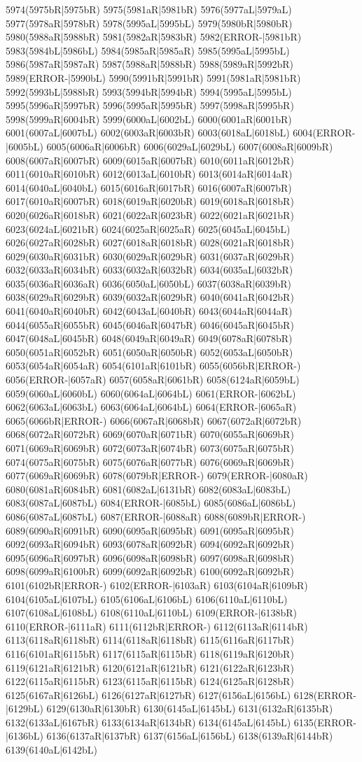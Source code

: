 5974(5975bR|5975bR) 5975(5981aR|5981bR) 5976(5977aL|5979aL) 5977(5978aR|5978bR) 5978(5995aL|5995bL) 5979(5980bR|5980bR) 5980(5988aR|5988bR) 5981(5982aR|5983bR) 5982(ERROR-|5981bR) 5983(5984bL|5986bL) 5984(5985aR|5985aR) 5985(5995aL|5995bL) 5986(5987aR|5987aR) 5987(5988aR|5988bR) 5988(5989aR|5992bR) 5989(ERROR-|5990bL) 5990(5991bR|5991bR) 5991(5981aR|5981bR) 5992(5993bL|5988bR) 5993(5994bR|5994bR) 5994(5995aL|5995bL) 5995(5996aR|5997bR) 5996(5995aR|5995bR) 5997(5998aR|5995bR) 5998(5999aR|6004bR) 5999(6000aL|6002bL) 6000(6001aR|6001bR) 6001(6007aL|6007bL) 6002(6003aR|6003bR) 6003(6018aL|6018bL) 6004(ERROR-|6005bL) 6005(6006aR|6006bR) 6006(6029aL|6029bL) 6007(6008aR|6009bR) 6008(6007aR|6007bR) 6009(6015aR|6007bR) 6010(6011aR|6012bR) 6011(6010aR|6010bR) 6012(6013aL|6010bR) 6013(6014aR|6014aR) 6014(6040aL|6040bL) 6015(6016aR|6017bR) 6016(6007aR|6007bR) 6017(6010aR|6007bR) 6018(6019aR|6020bR) 6019(6018aR|6018bR) 6020(6026aR|6018bR) 6021(6022aR|6023bR) 6022(6021aR|6021bR) 6023(6024aL|6021bR) 6024(6025aR|6025aR) 6025(6045aL|6045bL) 6026(6027aR|6028bR) 6027(6018aR|6018bR) 6028(6021aR|6018bR) 6029(6030aR|6031bR) 6030(6029aR|6029bR) 6031(6037aR|6029bR) 6032(6033aR|6034bR) 6033(6032aR|6032bR) 6034(6035aL|6032bR) 6035(6036aR|6036aR) 6036(6050aL|6050bL) 6037(6038aR|6039bR) 6038(6029aR|6029bR) 6039(6032aR|6029bR) 6040(6041aR|6042bR) 6041(6040aR|6040bR) 6042(6043aL|6040bR) 6043(6044aR|6044aR) 6044(6055aR|6055bR) 6045(6046aR|6047bR) 6046(6045aR|6045bR) 6047(6048aL|6045bR) 6048(6049aR|6049aR) 6049(6078aR|6078bR) 6050(6051aR|6052bR) 6051(6050aR|6050bR) 6052(6053aL|6050bR) 6053(6054aR|6054aR) 6054(6101aR|6101bR) 6055(6056bR|ERROR-) 6056(ERROR-|6057aR) 6057(6058aR|6061bR) 6058(6124aR|6059bL) 6059(6060aL|6060bL) 6060(6064aL|6064bL) 6061(ERROR-|6062bL) 6062(6063aL|6063bL) 6063(6064aL|6064bL) 6064(ERROR-|6065aR) 6065(6066bR|ERROR-) 6066(6067aR|6068bR) 6067(6072aR|6072bR) 6068(6072aR|6072bR) 6069(6070aR|6071bR) 6070(6055aR|6069bR) 6071(6069aR|6069bR) 6072(6073aR|6074bR) 6073(6075aR|6075bR) 6074(6075aR|6075bR) 6075(6076aR|6077bR) 6076(6069aR|6069bR) 6077(6069aR|6069bR) 6078(6079bR|ERROR-) 6079(ERROR-|6080aR) 6080(6081aR|6084bR) 6081(6082aL|6131bR) 6082(6083aL|6083bL) 6083(6087aL|6087bL) 6084(ERROR-|6085bL) 6085(6086aL|6086bL) 6086(6087aL|6087bL) 6087(ERROR-|6088aR) 6088(6089bR|ERROR-) 6089(6090aR|6091bR) 6090(6095aR|6095bR) 6091(6095aR|6095bR) 6092(6093aR|6094bR) 6093(6078aR|6092bR) 6094(6092aR|6092bR) 6095(6096aR|6097bR) 6096(6098aR|6098bR) 6097(6098aR|6098bR) 6098(6099aR|6100bR) 6099(6092aR|6092bR) 6100(6092aR|6092bR) 6101(6102bR|ERROR-) 6102(ERROR-|6103aR) 6103(6104aR|6109bR) 6104(6105aL|6107bL) 6105(6106aL|6106bL) 6106(6110aL|6110bL) 6107(6108aL|6108bL) 6108(6110aL|6110bL) 6109(ERROR-|6138bR) 6110(ERROR-|6111aR) 6111(6112bR|ERROR-) 6112(6113aR|6114bR) 6113(6118aR|6118bR) 6114(6118aR|6118bR) 6115(6116aR|6117bR) 6116(6101aR|6115bR) 6117(6115aR|6115bR) 6118(6119aR|6120bR) 6119(6121aR|6121bR) 6120(6121aR|6121bR) 6121(6122aR|6123bR) 6122(6115aR|6115bR) 6123(6115aR|6115bR) 6124(6125aR|6128bR) 6125(6167aR|6126bL) 6126(6127aR|6127bR) 6127(6156aL|6156bL) 6128(ERROR-|6129bL) 6129(6130aR|6130bR) 6130(6145aL|6145bL) 6131(6132aR|6135bR) 6132(6133aL|6167bR) 6133(6134aR|6134bR) 6134(6145aL|6145bL) 6135(ERROR-|6136bL) 6136(6137aR|6137bR) 6137(6156aL|6156bL) 6138(6139aR|6144bR) 6139(6140aL|6142bL) 
